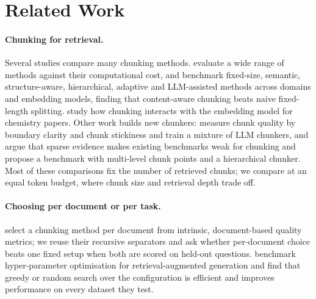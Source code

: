 \section{Related Work}
\label{sec:related}

\paragraph{Chunking for retrieval.} Several studies compare many
chunking methods. \citet{smigielski2026chunking} evaluate a wide range of
methods against their computational cost, and \citet{shaukat2026systematic}
benchmark fixed-size, semantic, structure-aware, hierarchical, adaptive and
LLM-assisted methods across domains and embedding models, finding that
content-aware chunking beats naive fixed-length splitting.
\citet{amiri2025chunk} study how chunking interacts with the embedding
model for chemistry papers. Other work builds new chunkers:
\citet{zhao2025moc} measure chunk quality by boundary clarity and chunk
stickiness and train a mixture of LLM chunkers, and \citet{lu2025hichunk}
argue that sparse evidence makes existing benchmarks weak for chunking and
propose a benchmark with multi-level chunk points and a hierarchical
chunker. Most of these comparisons fix the number of retrieved chunks; we
compare at an equal token budget, where chunk size and retrieval depth
trade off.

\paragraph{Choosing per document or per task.}
\citet{demourajunior2026adaptive} select a chunking method per document
from intrinsic, document-based quality metrics; we reuse their recursive
separators and ask whether per-document choice beats one fixed setup when
both are scored on held-out questions. \citet{orbach2025hpo} benchmark
hyper-parameter optimisation for retrieval-augmented generation and find
that greedy or random search over the configuration is efficient and
improves performance on every dataset they test.

